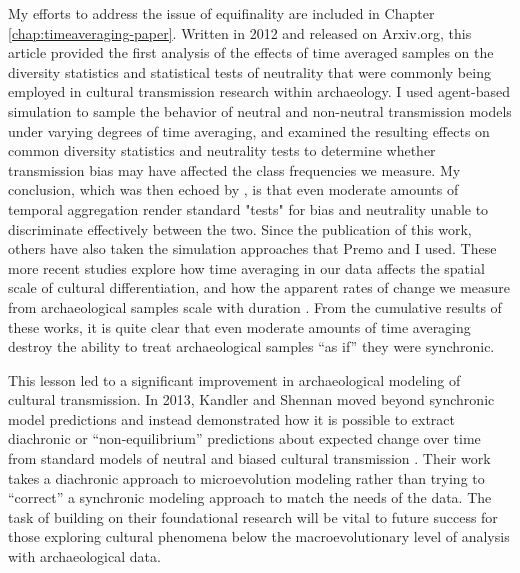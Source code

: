 My efforts to address the issue of equifinality are included in Chapter \ref{chap:timeaveraging-paper}. Written in 2012 and released on Arxiv.org, this article provided the first analysis of the effects of time averaged samples on the diversity statistics and statistical tests of neutrality that were commonly being employed in cultural transmission research within archaeology. I used agent-based simulation to sample the behavior of neutral and non-neutral transmission models under varying degrees of time averaging, and examined the resulting effects on common diversity statistics and neutrality tests to determine whether transmission bias may have affected the class frequencies we measure. My conclusion, which was then echoed by \citet{Premo2014}, is that even moderate amounts of temporal aggregation render standard "tests" for bias and neutrality unable to discriminate effectively between the two. Since the publication of this work, others have also taken the simulation approaches that Premo and I used. These more recent studies explore how time averaging in our data affects the spatial scale of cultural differentiation, and how the apparent rates of change we measure from archaeological samples scale with duration \citep{miller2018time,perreault2018time}. From the cumulative results of these works, it is quite clear that even moderate amounts of time averaging destroy the ability to treat archaeological samples ``as if'' they were synchronic.

This lesson led to a significant improvement in archaeological modeling of cultural transmission. In 2013, Kandler and Shennan \citeyearpar{Kandler2013} moved beyond synchronic model predictions and  instead demonstrated how it is possible to extract diachronic or “non-equilibrium” predictions about expected change over time from standard models of neutral and biased cultural transmission . Their work takes a diachronic approach to microevolution modeling rather than trying to “correct” a synchronic modeling approach to match the needs of the data.  The task of building on their foundational research will be vital to future success for those exploring cultural phenomena below the macroevolutionary level of analysis with archaeological data.

